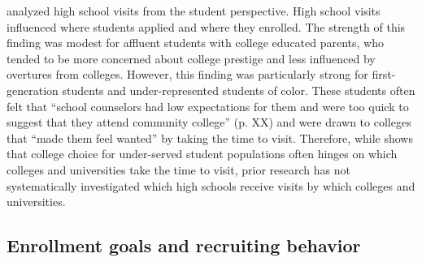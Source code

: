 \documentclass[twoside]{article}
\begin{document}

\cite{RN4324} analyzed high school visits from the student perspective. High school visits influenced where students applied and where they enrolled. The strength of this finding was modest for affluent students with college educated parents, who tended to be more concerned about college prestige and less influenced by overtures from colleges. However, this finding was particularly strong for first-generation students and under-represented students of color.  These students often felt that ``school counselors had low expectations for them and were too quick to suggest that they attend community college'' (p. XX) and were drawn to colleges that ``made them feel wanted'' by taking the time to visit.  Therefore, while \cite{RN4324} shows that college choice for under-served student populations often hinges on which colleges and universities take the time to visit, prior research has not systematically investigated which high schools receive visits by which colleges and universities.

\subsection*{Enrollment goals and recruiting behavior}
\end{document}
